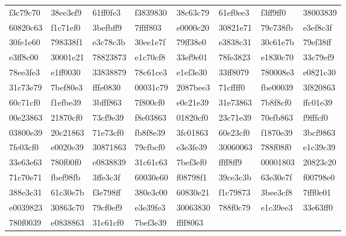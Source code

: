 \documentclass[11pt]{article}
\begin{document}
\begin{center}
\begin{tabular}{@{}llllllll@{}}
f3c79c70 & 38ee3ef9 & 61ff0fe3 & f3839830 & 38c63c79 & 61ef0ee3 & f3ff9ff0 & 38003839 \\
60820c63 & f1c71ef0 & 3befbff9 & 7ffff803 & e0000c20 & 30821e71 & 79c738fb & e3ef8c3f \\
30fe1e60 & 798338f1 & e3c78c3b & 30ee1e7f & 79ff38e0 & e3838c31 & 30c61e7b & 79ef38ff \\
e3ff8c00 & 30001e21 & 78823873 & e1c70cf8 & 33ef9e01 & 78fe3823 & e1830c70 & 33c79ef9 \\
78ee3fe3 & e1ff0030 & 33838879 & 78c61ce3 & e1ef3e30 & 33ff8079 & 780008e3 & e0821c30 \\
31c73e79 & 7bef80e3 & fffe0830 & 00031c79 & 2087bee3 & 71cffff0 & fbe00039 & 3f820863 \\
60c71cf0 & f1efbe39 & 3bfff863 & 7f800cf0 & e0c21e39 & 31e73863 & 7b8f8cf0 & ffc01e39 \\
00e23863 & 21870cf0 & 73cf9e39 & f8e03863 & 01820cf0 & 23c71e39 & 70efb863 & f9fffcf0 \\
03800e39 & 20c21863 & 71e73cf0 & fb8f8e39 & 3fc01863 & 60e23cf0 & f1870e39 & 3bcf9863 \\
7fe03cf0 & e0020e39 & 30871863 & 79cfbcf0 & e3e3fe39 & 30060063 & 788f08f0 & e1c39c39 \\
33e63e63 & 780f00f0 & e0838839 & 31c61c63 & 7bef3ef0 & ffff8ff9 & 00001803 & 20823c20 \\
71c70e71 & fbef98fb & 3ffe3c3f & 60030e60 & f08798f1 & 39ce3c3b & 63e30e7f & f00798e0 \\
388e3c31 & 61c30e7b & f3e798ff & 380e3c00 & 60830e21 & f1c79873 & 3bee3cf8 & 7fff0e01 \\
e0039823 & 30863c70 & 79cf0ef9 & e3e39fe3 & 30063830 & 788f0c79 & e1c39ee3 & 33e63ff0 \\
780f0039 & e0838863 & 31c61cf0 & 7bef3e39 & ffff8063 \\
\end{tabular}
\end{center}
\end{document}

